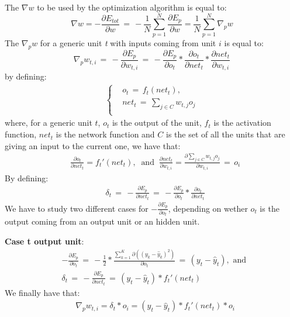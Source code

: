 The $\nabla w $ to be used by the optimization algorithm is equal to:
\begin{equation*}
\label{derivationGradient}
\nabla w= -\frac{\partial E_{tot}}{\partial w} \, =\, - \frac{1}{N}\sum_{p=1}^N \frac{\partial E_p}{\partial w} = \frac{1}{N}\sum_{p=1}^N \nabla_{p} w
\end{equation*}
The $\nabla_{p} w $ for a generic unit \textit{t} with inputs coming from unit $i$ is equal to:
\begin{equation*}
\nabla_{p} w_{t,i} \, = \, -\frac{\partial E_p}{\partial w_{t,i}} \, = \, -\frac{\partial E_p}{\partial o_{t}} * \frac{\partial o_{t}}{\partial net_{t}}*\frac{\partial net_{t}}{\partial w_{t,i}}
\end{equation*}
by defining:
\begin{align*}
    \begin{cases}
        & o_{t} \, = \, f_{t}(net_{t}),\\
        & net_{t} \, = \, \sum_{j\in C} w_{t,j}o_{j}\\
    \end{cases}
\end{align*}
where, for a generic unit $t$, $o_t$ is the output of the unit, $f_t$ is the activation function, $net_t$ is the network function and $C$ is the set of all the units that are giving an input to the current one,
we have that:
\begin{align*}
    &\frac{\partial o_{t}}{\partial net_{t}} = {f_t}'(net_{t}),\ \text{ and }\ \frac{\partial net_{t}}{\partial w_{t,i}} = \frac{\partial\sum_{j\in C}  w_{t,j}o_{j}}{\partial w_{t,i}} \, = \, o_{i}
\end{align*}
By defining:
\begin{align*}
    & \delta_{t} \,=\, -\frac{\partial E_p}{\partial net_t} \, =\, {}-\frac{\partial E_p}{\partial o_{t}} * \frac{\partial o_{t}}{\partial net_{t}}
\end{align*}
We have to study two different cases for $-\frac{\partial E_p}{\partial o_{t}}$, depending on wether $o_{t}$ is the output coming from an output unit or an hidden unit.

\textbf{Case t output unit}:
\begin{align*}
& -\frac{\partial E_p}{\partial o_{t}} \, = \, -\frac{1}{2} * \frac{\sum_{k=1}^K \partial((y_k - \widehat{y}_k)^2)}{\partial o_{t}} \, = \, (y_t-\hat{y}_t), \text{ and }\\
& \delta_t\, =\,  -\frac{\partial E_p}{\partial net_t}\, = \, (y_t-\hat{y}_t) * {f_t}'(net_{t})
\end{align*}
We finally have that:
\begin{align*}
    & \nabla_p w_{t,i} = \delta_t * o_i = (y_t-\hat{y}_t) * {f_t}'(net_{t}) * o_i
\end{align*}

